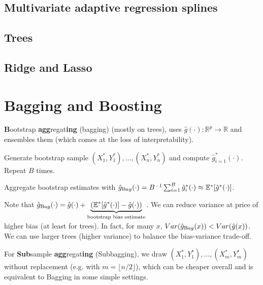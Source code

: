 \subsection{Multivariate adaptive regression splines}%
\label{sub:multivariate_adaptive_regression_splines}



\subsection{Trees}%
\label{sub:trees}

\subsection{Ridge and Lasso}%
\label{sub:ridge_and_lasso}



\section{Bagging and Boosting}\label{sec:bagging_and_boosting}
\begin{sectionbox}\nospacing{}
  \textbf{B}ootstrap \textbf{agg}regat\textbf{ing} (bagging) (mostly on trees), uses $\hat g(\cdot): \mathbb{R}^{p}\to \mathbb{R}$ and ensembles them (which comes at the loss of interpretability).
  \begin{enumeratenosep}[label=\roman*]
    \item Generate bootstrap sample $(X_{1}^{\ast}, Y_{1}^{\ast}), \dots, (X_{n}^{\ast}, Y_{n}^{\ast})$ and compute $\hat{g}^{\ast}_{i=1}(\cdot)$. Repeat $B$ times.
    \item Aggregate bootstrap estimates with $\hat{g}_{\textrm Bag}(\cdot) = B^{-1}\sum_{i=1}^{B} \hat{g}^{\ast}_{i}(\cdot) \approx \mathbb{E}^{\ast}[\hat{g}^{\ast}(\cdot)]$.
  \end{enumeratenosep}
  Note that $\hat{g}_{\textrm Bag}(\cdot) = \hat{g}(\cdot) + \underbrace{(\mathbb{E}^{\ast}[\hat{g}^{\ast}(\cdot)] -\hat{g}(\cdot))}_{\text{bootstrap bias estimate}}$.
  We can reduce variance at price of higher bias (at least for trees).
  In fact, for many $x$, $Var(\hat{g}_{\textrm Bag}(x)) < Var(\hat{g}(x))$. We can use larger trees (higher variance) to balance the bias-variance trade-off.

  For \textbf{Sub}sample \textbf{agg}regat\textbf{ing} (Subbagging), we draw $(X_{1}^{\ast}, Y_{1}^{\ast}), \dots, (X_{m}^{\ast}, Y_{m}^{\ast})$ without replacement (e.g. with $m = \lfloor n/2\rfloor$), which can be cheaper overall and is equivalent to Bagging in some simple settings.
\end{sectionbox}

